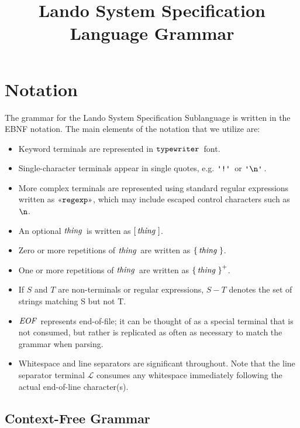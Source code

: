 \documentclass{article}
\newcommand{\gnl}{\ensuremath{\mathcal{L}}}
\begin{document}
\title{Lando System Specification Language Grammar}
\maketitle

\section{Notation}

The grammar for the Lando System Specification Sublanguage is written in the EBNF notation. The main elements of the notation that we utilize are:
\begin{itemize}
  \item Keyword terminals are represented in $\mathop{\texttt{typewriter}}\,$ font. 
  \item Single-character terminals appear in single quotes, e.g. $\gtkc{!}$ or $\gtkc{\gtesc{n}}$.
  \item More complex terminals are represented using standard regular expressions written as $\gtregex{regexp}$, which may include escaped control characters such as $\texttt{\textbackslash {n}}$. 
  \item An optional $\mathop{\textit{thing}}\,$ is written as $\mathop{\operatorname{[} \mathop{\mathop{\textit{thing}}\,} \operatorname{]}}$.
  \item {Zero or more repetitions of $\mathop{\textit{thing}}\,$ are written as $\mathop{\operatorname{\{} \mathop{\textit{thing}}\, \operatorname{\}}}$}.
  \item One or more repetitions of $\mathop{\textit{thing}}\,$ are written as $\mathop{\operatorname{\{} \mathop{\textit{thing}}\, \operatorname{\}}^+}$.
  \item If $S$ and $T$ are non-terminals or regular expressions, $S - T$ denotes the set of strings matching S but not T.
  \item $\mathop{\textit{EOF}}\,$ represents end-of-file; it can be thought of as a special terminal that is not consumed, but rather is replicated as often as necessary to match the grammar when parsing.
  \item Whitespace and line separators are significant throughout. Note that the line separator terminal $\gnl$ consumes any whitespace immediately following the actual end-of-line character(s).
\end{itemize}

\subsection{Context-Free Grammar}
\end{document}
